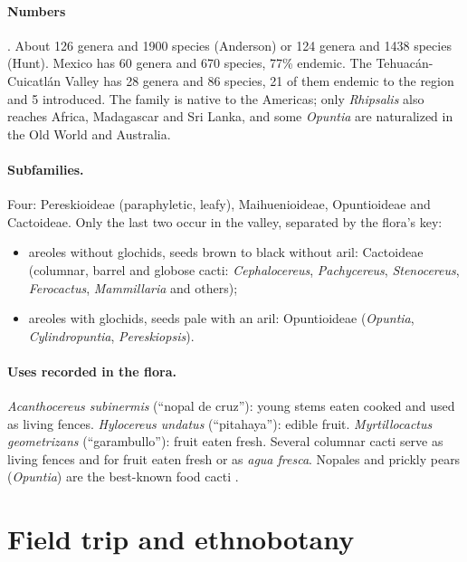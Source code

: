 \paragraph{Numbers}
\cite[pp.~2--3]{arias2012cactaceae}.
About 126 genera and 1900 species
(Anderson) or 124 genera and 1438 species
(Hunt). Mexico has 60 genera and 670
species, 77\% endemic. The
Tehuac\'an-Cuicatl\'an Valley has 28
genera and 86 species, 21 of them endemic
to the region and 5 introduced. The family
is native to the Americas; only
\emph{Rhipsalis} also reaches Africa,
Madagascar and Sri Lanka, and some
\emph{Opuntia} are naturalized in the Old
World and Australia.

\paragraph{Subfamilies.}
Four: Pereskioideae (paraphyletic, leafy),
Maihuenioideae, Opuntioideae and
Cactoideae. Only the last two occur in the
valley, separated by the flora's key:
\begin{itemize}
\item areoles without glochids, seeds brown
to black without aril: Cactoideae
(columnar, barrel and globose cacti:
\emph{Cephalocereus}, \emph{Pachycereus},
\emph{Stenocereus}, \emph{Ferocactus},
\emph{Mammillaria} and others);
\item areoles with glochids, seeds pale
with an aril: Opuntioideae (\emph{Opuntia},
\emph{Cylindropuntia},
\emph{Pereskiopsis}).
\end{itemize}

\paragraph{Uses recorded in the flora.}
\emph{Acanthocereus subinermis} (``nopal
de cruz''): young stems eaten cooked and
used as living fences. \emph{Hylocereus
undatus} (``pitahaya''): edible fruit.
\emph{Myrtillocactus geometrizans}
(``garambullo''): fruit eaten fresh. Several
columnar cacti serve as living fences and
for fruit eaten fresh or as \emph{agua
fresca}. Nopales and prickly pears
(\emph{Opuntia}) are the best-known food
cacti \cite[Chapter 8]{simpson2006plant}.

\section{Field trip and ethnobotany}
\label{section-field-trip}

